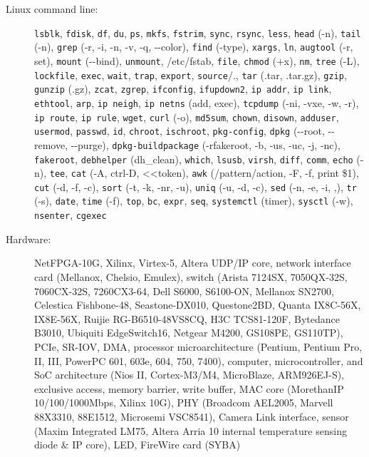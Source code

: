 \documentclass[letterpaper,11pt]{article}
\begin{document}
\begin{description}
\item[Linux command line:] {\tt lsblk}, {\tt fdisk}, {\tt df}, {\tt du},
{\tt ps},
{\tt mkfs}, {\tt fstrim}, {\tt sync},
{\tt rsync}, {\tt less}, {\tt head} (-n), {\tt tail} (-n), {\tt grep} (-r, -i, -n, -v, -q, -{}-color),
{\tt find} (-type), {\tt xargs}, {\tt ln}, {\tt augtool} (-r, set),
{\tt mount} (-{}-bind), {\tt unmount}, /etc/fstab,
{\tt file}, {\tt chmod} (+x), {\tt nm}, {\tt tree} (-L), {\tt lockfile},
{\tt exec}, {\tt wait}, {\tt trap},
{\tt export}, {\tt source}/.,
{\tt tar} (.tar, .tar.gz), {\tt gzip}, {\tt gunzip} (.gz), {\tt zcat}, {\tt zgrep},
{\tt ifconfig}, {\tt ifupdown2}, {\tt ip addr}, {\tt ip link}, {\tt ethtool}, {\tt arp}, {\tt ip neigh}, {\tt ip netns} (add, exec),
{\tt tcpdump} (-ni, -vxe, -w, -r), {\tt ip route}, {\tt ip rule},
{\tt wget}, {\tt curl} (-o), {\tt md5sum},
{\tt chown}, {\tt disown}, {\tt adduser}, {\tt usermod}, {\tt passwd}, {\tt id}, {\tt chroot}, {\tt ischroot},
{\tt pkg-config}, {\tt dpkg} (-{}-root, -{}-remove, -{}-purge),
{\tt dpkg-buildpackage} (-rfakeroot, -b, -us, -uc, -j, -nc), {\tt fakeroot}, {\tt debhelper} (dh\_clean),
{\tt which},
{\tt lsusb},
{\tt virsh},
{\tt diff}, {\tt comm},
{\tt echo} (-n), {\tt tee}, {\tt cat} (-A, ctrl-D, \textless\textless token), {\tt awk} (/pattern/action, -F, -f, print \$1), {\tt cut} (-d, -f, -c),
{\tt sort} (-t, -k, -nr, -u), {\tt uniq} (-u, -d, -c), {\tt sed} (-n, -e, -i, ,), {\tt tr} (-s),
{\tt date}, {\tt time} (-f),
{\tt top},
{\tt bc}, {\tt expr}, {\tt seq},
{\tt systemctl} (timer), {\tt sysctl} (-w),
{\tt nsenter}, {\tt cgexec}

\item[Hardware:] NetFPGA-10G, Xilinx, Virtex-5, Altera UDP/IP core, network interface card (Mellanox, Chelsio, Emulex),
switch (Arista 7124SX, 7050QX-32S, 7060CX-32S, 7260CX3-64, Dell S6000, S6100-ON, Mellanox SN2700,
Celestica Fishbone-48, Seastone-DX010, Questone2BD,
Quanta IX8C-56X, IX8E-56X, Ruijie RG-B6510-48VS8CQ, H3C TCS81-120F, Bytedance B3010,
Ubiquiti EdgeSwitch16, Netgear M4200, GS108PE, GS110TP), PCIe, SR-IOV, DMA,
processor microarchitecture (Pentium, Pentium Pro, II, III, PowerPC 601, 603e, 604, 750, 7400),
computer, microcontroller, and SoC architecture (Nios II, Cortex-M3/M4, MicroBlaze, ARM926EJ-S),
exclusive access, memory barrier, write buffer,
MAC core (MorethanIP 10/100/1000Mbps, Xilinx 10G),
PHY (Broadcom AEL2005, Marvell 88X3310, 88E1512, Microsemi VSC8541), Camera Link interface, sensor (Maxim Integrated LM75,
Altera Arria 10 internal temperature sensing diode \& IP core), LED,
FireWire card (SYBA)


\end{description}
\end{document}
